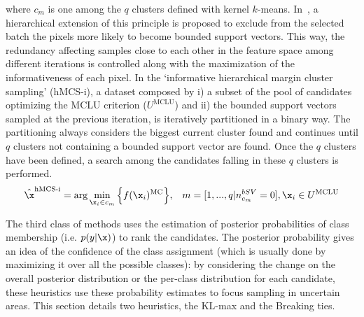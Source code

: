 where $c_m$ is one among the $q$ clusters defined with kernel $k$-means. 
In~, a hierarchical extension of this principle is proposed to exclude from the selected batch the pixels more likely to become bounded support vectors. This way, the redundancy affecting samples close to each other in the feature space among different iterations is controlled along with the maximization of the informativeness of each pixel.
In the `informative hierarchical margin cluster sampling' (hMCS-i), a dataset composed by i) a subset of the pool of candidates optimizing the MCLU criterion ($U^{\text{MCLU}}$) and ii)  the bounded support vectors sampled at the previous iteration, is iteratively partitioned in a binary way. The partitioning always considers the biggest current cluster found and continues until $q$ clusters not containing a bounded support vector are found. Once the $q$ clusters have been defined, a search among the candidates falling in these $q$ clusters is performed.
\begin{equation}
\hat{\x}^{\text{hMCS-i}} = \arg \min_{\x_i \in c_m } \Big\{f(\x_i)^{\text{MC}}   \Big\}\text{,}\quad m = [1, ..., q \vert n^{bSV}_{c_m} = 0], \x_i \in U^{\text{MCLU}}
\label{eq:hMCS}
\end{equation}

\label{sec:poster}
The third class of methods uses the estimation of posterior probabilities of class membership (i.e. $p( y | \x)$) to rank the candidates. The posterior probability gives an idea of the confidence of the class assignment (which is usually done by maximizing it over all the possible classes): by considering the change on the overall posterior distribution or the per-class distribution for each candidate, these heuristics use these probability estimates to focus sampling in uncertain areas. This section details two heuristics, the KL-max and the Breaking ties.

